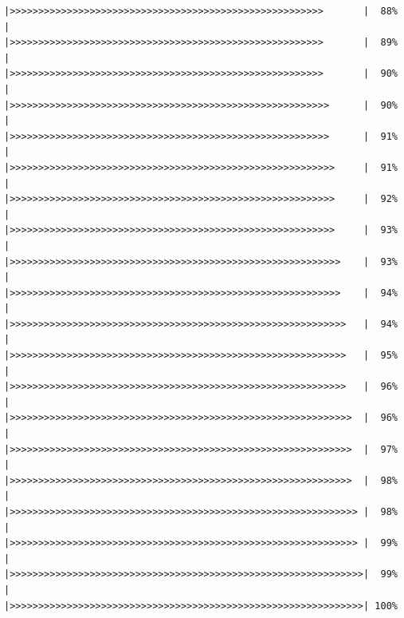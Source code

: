 \documentclass[
]{book}
\begin{document}
\begin{verbatim}
|>>>>>>>>>>>>>>>>>>>>>>>>>>>>>>>>>>>>>>>>>>>>>>>>>>>>>>>       |  88%  |                                                                      |>>>>>>>>>>>>>>>>>>>>>>>>>>>>>>>>>>>>>>>>>>>>>>>>>>>>>>>       |  89%  |                                                                      |>>>>>>>>>>>>>>>>>>>>>>>>>>>>>>>>>>>>>>>>>>>>>>>>>>>>>>>       |  90%  |                                                                      |>>>>>>>>>>>>>>>>>>>>>>>>>>>>>>>>>>>>>>>>>>>>>>>>>>>>>>>>      |  90%  |                                                                      |>>>>>>>>>>>>>>>>>>>>>>>>>>>>>>>>>>>>>>>>>>>>>>>>>>>>>>>>      |  91%  |                                                                      |>>>>>>>>>>>>>>>>>>>>>>>>>>>>>>>>>>>>>>>>>>>>>>>>>>>>>>>>>     |  91%  |                                                                      |>>>>>>>>>>>>>>>>>>>>>>>>>>>>>>>>>>>>>>>>>>>>>>>>>>>>>>>>>     |  92%  |                                                                      |>>>>>>>>>>>>>>>>>>>>>>>>>>>>>>>>>>>>>>>>>>>>>>>>>>>>>>>>>     |  93%  |                                                                      |>>>>>>>>>>>>>>>>>>>>>>>>>>>>>>>>>>>>>>>>>>>>>>>>>>>>>>>>>>    |  93%  |                                                                      |>>>>>>>>>>>>>>>>>>>>>>>>>>>>>>>>>>>>>>>>>>>>>>>>>>>>>>>>>>    |  94%  |                                                                      |>>>>>>>>>>>>>>>>>>>>>>>>>>>>>>>>>>>>>>>>>>>>>>>>>>>>>>>>>>>   |  94%  |                                                                      |>>>>>>>>>>>>>>>>>>>>>>>>>>>>>>>>>>>>>>>>>>>>>>>>>>>>>>>>>>>   |  95%  |                                                                      |>>>>>>>>>>>>>>>>>>>>>>>>>>>>>>>>>>>>>>>>>>>>>>>>>>>>>>>>>>>   |  96%  |                                                                      |>>>>>>>>>>>>>>>>>>>>>>>>>>>>>>>>>>>>>>>>>>>>>>>>>>>>>>>>>>>>  |  96%  |                                                                      |>>>>>>>>>>>>>>>>>>>>>>>>>>>>>>>>>>>>>>>>>>>>>>>>>>>>>>>>>>>>  |  97%  |                                                                      |>>>>>>>>>>>>>>>>>>>>>>>>>>>>>>>>>>>>>>>>>>>>>>>>>>>>>>>>>>>>  |  98%  |                                                                      |>>>>>>>>>>>>>>>>>>>>>>>>>>>>>>>>>>>>>>>>>>>>>>>>>>>>>>>>>>>>> |  98%  |                                                                      |>>>>>>>>>>>>>>>>>>>>>>>>>>>>>>>>>>>>>>>>>>>>>>>>>>>>>>>>>>>>> |  99%  |                                                                      |>>>>>>>>>>>>>>>>>>>>>>>>>>>>>>>>>>>>>>>>>>>>>>>>>>>>>>>>>>>>>>|  99%  |                                                                      |>>>>>>>>>>>>>>>>>>>>>>>>>>>>>>>>>>>>>>>>>>>>>>>>>>>>>>>>>>>>>>| 100%

\end{verbatim}
\end{document}
